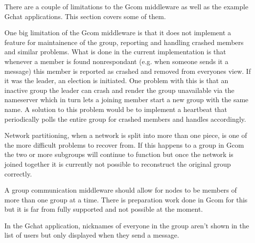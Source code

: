 There are a couple of limitations to the Gcom middleware as well as the example Gchat applications.
This section covers some of them.

	One big limitation of the Gcom middleware is that it does not implement a feature for maintainence of the group, reporting and handling crashed members and similar problems.
	What is done in the current implementation is that whenever a member is found nonrespondant (e.g. when someone sends it a message) this member is reported as crashed and removed from everyones view.
	If it was the leader, an election is initiated.
	One problem with this is that an inactive group the leader can crash and render the group unavailable via the nameserver which in turn lets a joining member start a new group with the same name.
	A solution to this problem would be to implement a heartbeat that periodically polls the entire group for crashed members and handles accordingly.

	Network partitioning, when a network is split into more than one piece, is one of the more difficult problems to recover from.
	If this happens to a group in Gcom the two or more subgroups will continue to function but once the network is joined together it is currently not possible to reconstruct the original group correctly.

	A group communication middleware should allow for nodes to be members of more than one group at a time.
	There is preparation work done in Gcom for this but it is far from fully supported and not possible at the moment.

	In the Gchat application, nicknames of everyone in the group aren't shown in the list of users but only displayed when they send a message.
